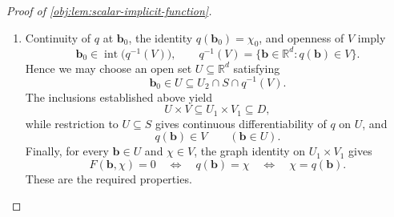 \begin{proof}[Proof of \cref{obj:lem:scalar-implicit-function}]
\begin{enumerate}
\item Continuity of \(q\) at \(\mathbf b_0\), the identity \(q(\mathbf b_0)=\chi_0\), and openness of \(V\) imply
\[
\mathbf b_0\in\operatorname{int}\bigl(q^{-1}(V)\bigr),
\qquad
q^{-1}(V)=\{\mathbf b\in\mathbb R^d:q(\mathbf b)\in V\}.
\]
Hence we may choose an open set \(U\subseteq\mathbb R^d\) satisfying
\[
\mathbf b_0\in U
\subseteq U_2\cap S\cap q^{-1}(V).
\]
The inclusions established above yield
\[
U\times V\subseteq U_1\times V_1\subseteq D,
\]
while restriction to \(U\subseteq S\) gives continuous differentiability of \(q\) on \(U\), and
\[
q(\mathbf b)\in V
\qquad(\mathbf b\in U).
\]
Finally, for every \(\mathbf b\in U\) and \(\chi\in V\), the graph identity on \(U_1\times V_1\) gives
\[
F(\mathbf b,\chi)=0
\quad\Longleftrightarrow\quad
q(\mathbf b)=\chi
\quad\Longleftrightarrow\quad
\chi=q(\mathbf b).
\]
These are the required properties. %
\end{enumerate}
\end{proof}
